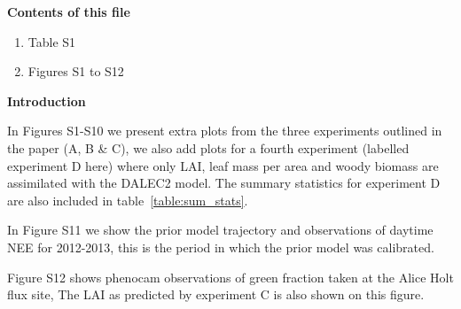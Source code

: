 \documentclass[draft,jgrga]{agutexSI}
\begin{document}
%
%

%

\begin{article}

%
%



\noindent\textbf{Contents of this file}
\begin{enumerate}
\item Table S1
\item Figures S1 to S12
\end{enumerate}


\noindent\textbf{Introduction}

In Figures S1-S10 we present extra plots from the three experiments outlined in the paper (A, B \& C), we also add plots for a fourth experiment (labelled experiment D here) where only LAI, leaf mass per area and woody biomass are assimilated with the DALEC2 model. The summary statistics for experiment D are also included in table~\ref{table:sum_stats}.

In Figure S11 we show the prior model trajectory and observations of daytime NEE for 2012-2013, this is the period in which the prior model was calibrated.

Figure S12 shows phenocam observations of green fraction taken at the Alice Holt flux site, The LAI as predicted by experiment C is also shown on this figure.

%


\end{article}
\end{document}
